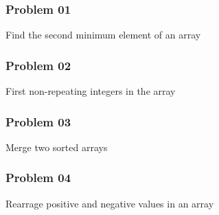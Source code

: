 \subsubsection{Problem 01}
\textsf{Find the second minimum element of an array}


\subsubsection{Problem 02}
\textsf{First non-repeating integers in the array}


\subsubsection{Problem 03}
\textsf{Merge two sorted arrays}


\subsubsection{Problem 04}
\textsf{Rearrage positive and negative values in an array}